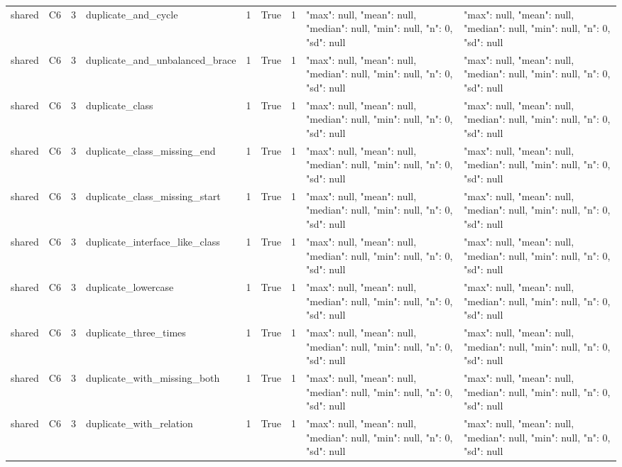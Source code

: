 \begin{tabular}{lllllllll}
shared & C6 & 3 & duplicate\_and\_cycle & 1 & True & 1 & {"max": null, "mean": null, "median": null, "min": null, "n": 0, "sd": null} & {"max": null, "mean": null, "median": null, "min": null, "n": 0, "sd": null} \\
shared & C6 & 3 & duplicate\_and\_unbalanced\_brace & 1 & True & 1 & {"max": null, "mean": null, "median": null, "min": null, "n": 0, "sd": null} & {"max": null, "mean": null, "median": null, "min": null, "n": 0, "sd": null} \\
shared & C6 & 3 & duplicate\_class & 1 & True & 1 & {"max": null, "mean": null, "median": null, "min": null, "n": 0, "sd": null} & {"max": null, "mean": null, "median": null, "min": null, "n": 0, "sd": null} \\
shared & C6 & 3 & duplicate\_class\_missing\_end & 1 & True & 1 & {"max": null, "mean": null, "median": null, "min": null, "n": 0, "sd": null} & {"max": null, "mean": null, "median": null, "min": null, "n": 0, "sd": null} \\
shared & C6 & 3 & duplicate\_class\_missing\_start & 1 & True & 1 & {"max": null, "mean": null, "median": null, "min": null, "n": 0, "sd": null} & {"max": null, "mean": null, "median": null, "min": null, "n": 0, "sd": null} \\
shared & C6 & 3 & duplicate\_interface\_like\_class & 1 & True & 1 & {"max": null, "mean": null, "median": null, "min": null, "n": 0, "sd": null} & {"max": null, "mean": null, "median": null, "min": null, "n": 0, "sd": null} \\
shared & C6 & 3 & duplicate\_lowercase & 1 & True & 1 & {"max": null, "mean": null, "median": null, "min": null, "n": 0, "sd": null} & {"max": null, "mean": null, "median": null, "min": null, "n": 0, "sd": null} \\
shared & C6 & 3 & duplicate\_three\_times & 1 & True & 1 & {"max": null, "mean": null, "median": null, "min": null, "n": 0, "sd": null} & {"max": null, "mean": null, "median": null, "min": null, "n": 0, "sd": null} \\
shared & C6 & 3 & duplicate\_with\_missing\_both & 1 & True & 1 & {"max": null, "mean": null, "median": null, "min": null, "n": 0, "sd": null} & {"max": null, "mean": null, "median": null, "min": null, "n": 0, "sd": null} \\
shared & C6 & 3 & duplicate\_with\_relation & 1 & True & 1 & {"max": null, "mean": null, "median": null, "min": null, "n": 0, "sd": null} & {"max": null, "mean": null, "median": null, "min": null, "n": 0, "sd": null} \\

\end{tabular}
